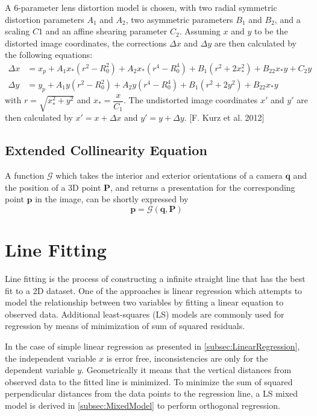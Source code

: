 A 6-parameter lens distortion model is chosen, with two radial symmetric distortion parameters $A_1$ and $A_2$, two asymmetric parameters $B_1$ and $B_2$, and a scaling $C1$ and an affine shearing parameter $C_2$. Assuming $x$ and $y$ to be the distorted image coordinates, the corrections $\Delta x$ and $\Delta y$ are then calculated by the following equations:
\begin{equation} \label{eq:LensDistortion}
\begin{split}
\Delta x &= x_p + A_1x_*(r^2-R_0^2) + A_2x_*(r^4-R_0^4) + B_1(r^2+2x_*^2) + B_22x_*y+C_2y \\
\Delta y &= y_p + A_1y  (r^2-R_0^2) + A_2y  (r^4-R_0^4) + B_1(r^2+2y^2)   + B_22x_*y
\end{split}
\end{equation}
with $r=\sqrt{x_*^2+y^2}$ and $x_*=\dfrac{x}{C_1}$. The undistorted image coordinates $x\prime$ and $y\prime$ are then calculated by $x\prime=x+\Delta x$ and $y\prime=y+\Delta y$. [F. Kurz et al. 2012] 

\subsection{Extended Collinearity Equation}
\label{subsec:ExtendedCollinearity}
A function $\mathcal{G}$ which takes the interior and exterior orientations of a camera $\mathbf{q}$ and the position of a 3D point $\mathbf{P}$, and returns a presentation for the corresponding point $\mathbf{p}$ in the image, can be shortly expressed by
\begin{equation} \label{eq:Gfunction}
\mathbf{p} = \mathcal{G}(\mathbf{q},\mathbf{P}) 
\end{equation}

\section{Line Fitting}
\label{sec:LineFitting}

Line fitting is the process of constructing a infinite straight line that has the best fit to a 2D dataset. One of the approaches is linear regression which attempts to model the relationship between two variables by fitting a linear equation to observed data. %
Additional least-squares (LS) models are commonly used for regression by means of minimization of sum of squared residuals.

In the case of simple linear regression as presented in \cref{subsec:LinearRegression}, the independent variable $x$ is error free, inconsistencies are only for the dependent variable $y$. Geometrically it means that the vertical distances from observed data to the fitted line is minimized. To minimize the sum of squared perpendicular distances from the data points to the regression line, a LS mixed model is derived in \cref{subsec:MixedModel} to perform orthogonal regression.

